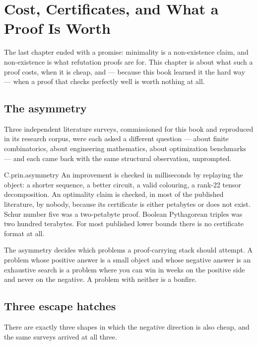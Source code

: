 \chapter{Cost, Certificates, and What a Proof Is Worth}
\label{ch:certificates}

The last chapter ended with a promise: minimality is a non-existence claim, and non-existence is what refutation proofs are for. This chapter is about what such a proof costs, when it is cheap, and --- because this book learned it the hard way --- when a proof that checks perfectly well is worth nothing at all.

\section{The asymmetry}
\label{sec:asymmetry}

Three independent literature surveys, commissioned for this book and reproduced in its research corpus, were each asked a different question --- about finite combinatorics, about engineering mathematics, about optimization benchmarks --- and each came back with the same structural observation, unprompted.

\begin{artifact}{C.prin.asymmetry}
An improvement is checked in milliseconds by replaying the object: a shorter sequence, a better circuit, a valid colouring, a rank-22 tensor decomposition. An optimality claim is checked, in most of the published literature, by nobody, because its certificate is either petabytes or does not exist. Schur number five was a two-petabyte proof. Boolean Pythagorean triples was two hundred terabytes. For most published lower bounds there is no certificate format at all.
\end{artifact}

The asymmetry decides which problems a proof-carrying stack should attempt. A problem whose positive answer is a small object and whose negative answer is an exhaustive search is a problem where you can win in weeks on the positive side and never on the negative. A problem with neither is a bonfire.

\section{Three escape hatches}
\label{sec:hatches}

There are exactly three shapes in which the negative direction is also cheap, and the same surveys arrived at all three.

